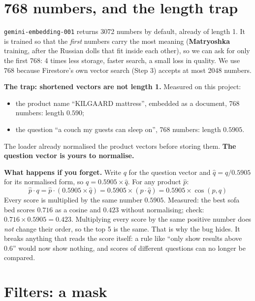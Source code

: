\documentclass[11pt,a4paper]{article}
\newcommand{\code}[1]{\texttt{#1}}
\begin{document}
\section{768 numbers, and the length trap}\label{sec:dims}

\code{gemini-embedding-001} returns 3072 numbers by default, already of
length 1. It is trained so that the \emph{first} numbers carry the most
meaning (\textbf{Matryoshka} training, after the Russian dolls that fit
inside each other), so we can ask for only the first 768: 4 times less
storage, faster search, a small loss in quality. We use 768 because
Firestore's own vector search (Step 3) accepts at most 2048 numbers.

\textbf{The trap: shortened vectors are not length 1.} Measured on this
project:
\begin{itemize}[nosep, leftmargin=1.4em]
  \item the product name ``KILGAARD mattress'', embedded as a document,
        768 numbers: length $0.590$;
  \item the question ``a couch my guests can sleep on'', 768 numbers:
        length $0.5905$.
\end{itemize}
The loader already normalised the product vectors before storing them.
\textbf{The question vector is yours to normalise.}

\textbf{What happens if you forget.} Write $q$ for the question vector
and $\hat{q} = q / 0.5905$ for its normalised form, so $q = 0.5905 \times
\hat{q}$. For any product $\hat{p}$:
\[
\hat{p} \cdot q = \hat{p} \cdot (0.5905 \times \hat{q})
  = 0.5905 \times (\hat{p} \cdot \hat{q})
  = 0.5905 \times \cos(p, q)
\]
Every score is multiplied by the same number $0.5905$. Measured: the
best sofa bed scores $0.716$ as a cosine and $0.423$ without
normalising; check: $0.716 \times 0.5905 = 0.423$. Multiplying every
score by the same positive number does \emph{not} change their order, so
the top 5 is the same. That is why the bug hides. It breaks anything
that reads the score itself: a rule like ``only show results above
0.6'' would now show nothing, and scores of different questions can no
longer be compared.

\section{Filters: a mask}
\end{document}
